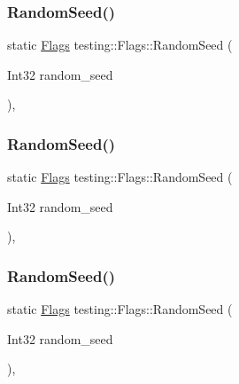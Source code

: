 \mbox{\label{structtesting_1_1_flags_a695cd8b8ab44df5eaa371bacded78c05}} 
\subsubsection{\texorpdfstring{RandomSeed()}{RandomSeed()}\hspace{0.1cm}{\footnotesize\ttfamily [1/3]}}
{\footnotesize\ttfamily static \mbox{\hyperlink{structtesting_1_1_flags}{Flags}} testing\+::\+Flags\+::\+Random\+Seed (\begin{DoxyParamCaption}\item[{Int32}]{random\+\_\+seed }\end{DoxyParamCaption})\hspace{0.3cm}{\ttfamily [inline]}, {\ttfamily [static]}}

\mbox{\label{structtesting_1_1_flags_a695cd8b8ab44df5eaa371bacded78c05}} 
\subsubsection{\texorpdfstring{RandomSeed()}{RandomSeed()}\hspace{0.1cm}{\footnotesize\ttfamily [2/3]}}
{\footnotesize\ttfamily static \mbox{\hyperlink{structtesting_1_1_flags}{Flags}} testing\+::\+Flags\+::\+Random\+Seed (\begin{DoxyParamCaption}\item[{Int32}]{random\+\_\+seed }\end{DoxyParamCaption})\hspace{0.3cm}{\ttfamily [inline]}, {\ttfamily [static]}}

\mbox{\label{structtesting_1_1_flags_a695cd8b8ab44df5eaa371bacded78c05}} 
\subsubsection{\texorpdfstring{RandomSeed()}{RandomSeed()}\hspace{0.1cm}{\footnotesize\ttfamily [3/3]}}
{\footnotesize\ttfamily static \mbox{\hyperlink{structtesting_1_1_flags}{Flags}} testing\+::\+Flags\+::\+Random\+Seed (\begin{DoxyParamCaption}\item[{Int32}]{random\+\_\+seed }\end{DoxyParamCaption})\hspace{0.3cm}{\ttfamily [inline]}, {\ttfamily [static]}}

